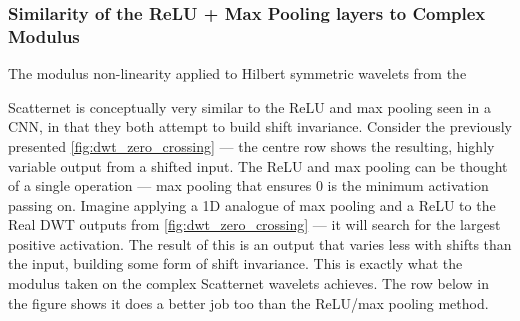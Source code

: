 \subsubsection{Similarity of the ReLU + Max Pooling layers to Complex Modulus}
  The modulus non-linearity applied to Hilbert symmetric wavelets from the

  Scatternet is conceptually very similar to the ReLU and max pooling seen in
  a CNN, in that they both attempt to build shift invariance. Consider the
  previously presented \autoref{fig:dwt_zero_crossing} --- the centre row shows
  the resulting, highly variable output from a shifted input. The ReLU and max pooling can be
  thought of a single operation --- max pooling that ensures 0 is the minimum
  activation passing on. Imagine applying a 1D analogue of max pooling and
  a ReLU to the Real DWT outputs from \autoref{fig:dwt_zero_crossing} --- it
  will search for the largest positive activation. The result of this is an 
  output that varies less with shifts than the input, building some
  form of shift invariance. This is exactly what the modulus taken on the
  complex Scatternet wavelets achieves. The row below in the figure shows it
  does a better job too than the ReLU/max pooling method.

% 
% 
% 
% 
% 
% 
% 
% 
% 
